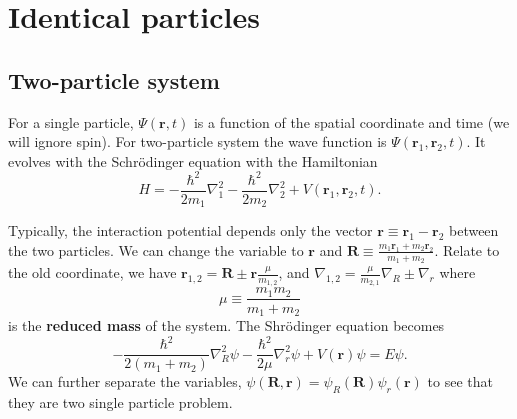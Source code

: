 \chapter{Identical particles}

\section{Two-particle system}
For a single particle, $\Psi \left( \mathbf{r},t \right)$ is a function of the spatial coordinate and time (we will ignore spin).
For two-particle system the wave function is $\Psi \left( \mathbf{r}_1, \mathbf{r}_2, t \right)$.
It evolves with the Schr\"odinger equation with the Hamiltonian
\begin{equation}
  \label{eq:5-1}
 H = - \frac{\hbar^{2}}{2m_{1}} \nabla_1^2 - \frac{\hbar^{2}}{2m_{2}} \nabla_2^2 + V \left( \mathbf{r}_1,\mathbf{r}_2,t \right).
\end{equation}

Typically, the interaction potential depends only the vector $\mathbf{r} \equiv \mathbf{r}_1 - \mathbf{r}_2$ between the two particles.
We can change the variable to $\mathbf{r}$ and $\mathbf{R} \equiv \frac{m_{1} \mathbf{r}_1 + m_2 \mathbf{r}_2}{m_1+m_2}$.
Relate to the old coordinate, we have $\mathbf{r}_{1,2} = \mathbf{R} \pm \mathbf{r} \frac{\mu}{m_{1,2}}$, and $\nabla_{1,2} = \frac{\mu}{m_{2,1}} \nabla_R \pm \nabla_{r}$ where
\begin{equation}
  \label{eq:5-2}
 \mu \equiv \frac{m_1 m_2}{m_1 + m_2}
\end{equation}
is the \textbf{reduced mass} of the system.
The Shr\"odinger equation becomes
\begin{equation}
  \label{eq:5-3}
 - \frac{\hbar^{2}}{2 \left( m_1 + m_2 \right)}  \nabla^2_R \psi - \frac{\hbar^{2}}{2\mu} \nabla^2_r \psi + V \left( \mathbf{r} \right) \psi = E\psi.
\end{equation}
We can further separate the variables, $\psi \left( \mathbf{R}, \mathbf{r} \right) = \psi_R \left( \mathbf{R} \right) \psi_r \left( \mathbf{r} \right)$ to see that they are two single particle problem.

